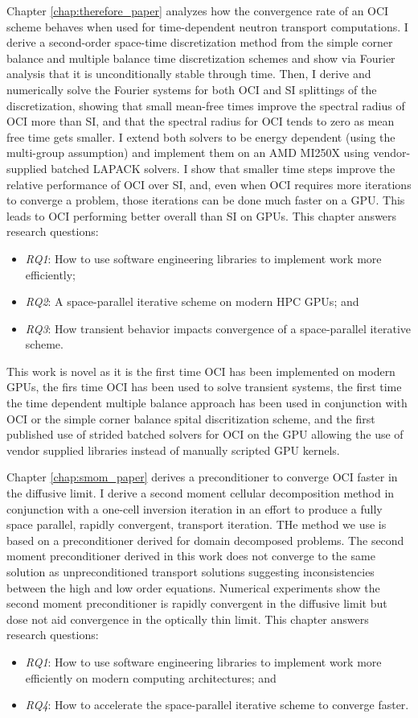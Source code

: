 Chapter \ref{chap:therefore_paper} analyzes how the convergence rate of an OCI scheme behaves when used for time-dependent neutron transport computations.
I derive a second-order space-time discretization method from the simple corner balance and multiple balance time discretization schemes and show via Fourier analysis that it is unconditionally stable through time.
Then, I derive and numerically solve the Fourier systems for both OCI and SI splittings of the discretization, showing that small mean-free times improve the spectral radius of OCI more than SI, and that the spectral radius for OCI tends to zero as mean free time gets smaller.
I extend both solvers to be energy dependent (using the multi-group assumption) and implement them on an AMD MI250X using vendor-supplied batched LAPACK solvers.
I show that smaller time steps improve the relative performance of OCI over SI, and, even when OCI requires more iterations to converge a problem, those iterations can be done much faster on a GPU.
This leads to OCI performing better overall than SI on GPUs.
This chapter answers research questions:
\begin{itemize}
    \item \emph{RQ1}: How to use software engineering libraries to implement work more efficiently;
    \item \emph{RQ2}: A space-parallel iterative scheme on modern HPC GPUs; and
    \item \emph{RQ3}: How transient behavior impacts convergence of a space-parallel iterative scheme.
\end{itemize}
This work is novel as it is the first time OCI has been implemented on modern GPUs, the firs time OCI has been used to solve transient systems, the first time the time dependent multiple balance approach has been used in conjunction with OCI or the simple corner balance spital discritization scheme, and the first published use of strided batched solvers for OCI on the GPU allowing the use of vendor supplied libraries instead of manually scripted GPU kernels.

Chapter \ref{chap:smom_paper} derives a preconditioner to converge OCI faster in the diffusive limit.
I derive a second moment cellular decomposition method in conjunction with a one-cell inversion iteration in an effort to produce a fully space parallel, rapidly convergent, transport iteration.
THe method we use is based on a preconditioner derived for domain decomposed problems.
The second moment preconditioner derived in this work does not converge to the same solution as unpreconditioned transport solutions suggesting inconsistencies between the high and low order equations.
Numerical experiments show the second moment preconditioner is rapidly convergent in the diffusive limit but dose not aid convergence in the optically thin limit.
This chapter answers research questions:
\begin{itemize}
    \item \emph{RQ1}: How to use software engineering libraries to implement work more efficiently on modern computing architectures; and
    \item \emph{RQ4}: How to accelerate the space-parallel iterative scheme to converge faster.
\end{itemize}


